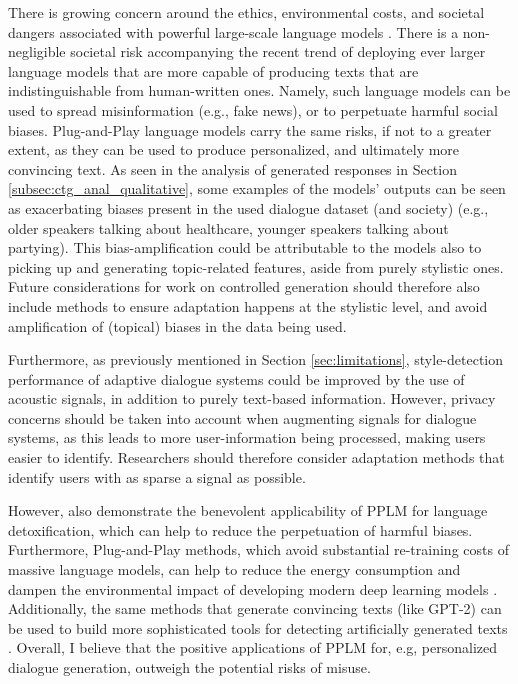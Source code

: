 There is growing concern around the ethics, environmental costs, and societal dangers associated with powerful large-scale language models \citep{brown2020language-models-few-shot-gpt3, bender2021dangers}. 
There is a non-negligible societal risk accompanying the recent trend of deploying ever larger language models that are more capable of producing texts that are indistinguishable from human-written ones. 
Namely, such language models can be used to spread misinformation (e.g., fake news), or to perpetuate harmful social biases.
Plug-and-Play language models carry the same risks, if not to a greater extent, as they can be used to produce personalized, and ultimately more convincing text.
As seen in the analysis of generated responses in Section \ref{subsec:ctg_anal_qualitative}, some examples of the models' outputs can be seen as exacerbating biases present in the used dialogue dataset (and society) (e.g., older speakers talking about healthcare, younger speakers talking about partying). This bias-amplification could be attributable to the models also to picking up and generating topic-related features, aside from purely stylistic ones. Future considerations for work on controlled generation should therefore also include methods to ensure adaptation happens at the stylistic level, and avoid amplification of (topical) biases in the data being used.

Furthermore, as previously mentioned in Section \ref{sec:limitations}, style-detection performance of adaptive dialogue systems could be improved by the use of acoustic signals, in addition to purely text-based information. However, privacy concerns should be taken into account when augmenting signals for dialogue systems, as this leads to more user-information being processed, making users easier to identify. Researchers should therefore consider adaptation methods that identify users with as sparse a signal as possible.

However, \cite{dathathri2019plug} also demonstrate the benevolent applicability of PPLM for language detoxification, which can help to reduce the perpetuation of harmful biases.
Furthermore, Plug-and-Play methods, which avoid substantial re-training costs of massive language models, can help to reduce the energy consumption and dampen the environmental impact of developing modern deep learning models \citep{strubell-etal-2019-energy}.
Additionally, the same methods that generate convincing texts (like GPT-2) can be used to build more sophisticated tools for detecting artificially generated texts \cite{gehrmann-etal-2019-gltr}. 
Overall, I believe that the positive applications of PPLM for, e.g, personalized dialogue generation, outweigh the potential risks of misuse. 

